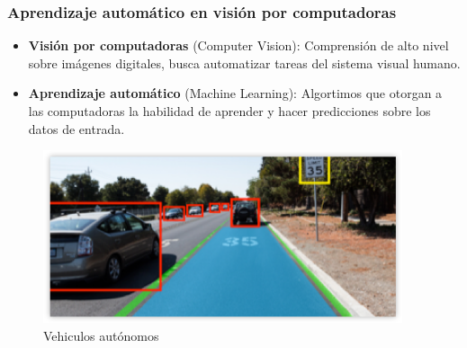 \documentclass[10pt,center]{beamer}
\begin{document}
\begin{frame}
  \frametitle{Aprendizaje automático en visión por computadoras}
  \begin{itemize}
    \item \textbf{Visión por computadoras} (Computer Vision): Comprensión de alto nivel sobre imágenes digitales, busca automatizar tareas del sistema visual humano.
    \item \textbf{Aprendizaje automático} (Machine Learning): Algortimos que otorgan a las computadoras la habilidad de aprender y hacer predicciones sobre los datos de entrada. 
  \end{itemize}
  
  \begin{figure}[H]
    \begin{center}
      \includegraphics[height=0.4\textheight]{./img/nvidia_car_detection.png}
    \end{center}
    \caption{Vehiculos autónomos}
  \end{figure}    
\end{frame}
  
\end{document}

